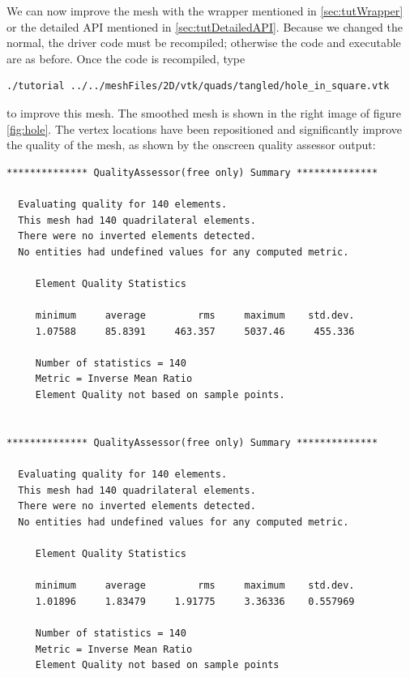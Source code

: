 We can now improve the mesh with the wrapper mentioned in
\ref{sec:tutWrapper} or the detailed API mentioned in
\ref{sec:tutDetailedAPI}. 
Because we changed the normal, the driver code must be recompiled;
otherwise the code and executable are as before.
Once the code is recompiled, type 
\begin{verbatim}
./tutorial ../../meshFiles/2D/vtk/quads/tangled/hole_in_square.vtk
\end{verbatim}
to improve this mesh.
The smoothed mesh is shown in the right image of figure
\ref{fig:hole}.
The vertex locations have been repositioned and significantly improve
the quality of the mesh, as shown by the onscreen
quality assessor output:  
\begin{verbatim}
************** QualityAssessor(free only) Summary **************

  Evaluating quality for 140 elements.
  This mesh had 140 quadrilateral elements.
  There were no inverted elements detected.
  No entities had undefined values for any computed metric.

     Element Quality Statistics

     minimum     average         rms     maximum    std.dev.
     1.07588     85.8391     463.357     5037.46     455.336

     Number of statistics = 140
     Metric = Inverse Mean Ratio
     Element Quality not based on sample points.


************** QualityAssessor(free only) Summary **************

  Evaluating quality for 140 elements.
  This mesh had 140 quadrilateral elements.
  There were no inverted elements detected.
  No entities had undefined values for any computed metric.

     Element Quality Statistics

     minimum     average         rms     maximum    std.dev.
     1.01896     1.83479     1.91775     3.36336    0.557969

     Number of statistics = 140
     Metric = Inverse Mean Ratio
     Element Quality not based on sample points
\end{verbatim}
